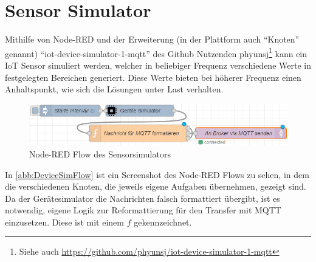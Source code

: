 \section{Sensor Simulator}\label{chap:iotdevicesim}
Mithilfe von Node-RED und der Erweiterung (in der Plattform auch \enquote{Knoten} genannt) \enquote{iot-device-simulator-1-mqtt} des Github Nutzenden phyunsj\footnote{Siehe auch \url{https://github.com/phyunsj/iot-device-simulator-1-mqtt}} kann ein \ac{IoT} Sensor simuliert werden, welcher in beliebiger Frequenz verschiedene Werte in festgelegten Bereichen generiert. Diese Werte bieten bei höherer Frequenz einen Anhaltspunkt, wie sich die Lösungen unter Last verhalten.
\begin{figure}[H]
\centering
\includegraphics[width=\textwidth]{graphics/Device-Simulator-Flow.png}
\caption{Node-RED Flow des Sensorsimulators}
\label{abb:DeviceSimFlow}
\end{figure}

In \autoref{abb:DeviceSimFlow} ist ein Screenshot des Node-RED Flows zu sehen, in dem die verschiedenen Knoten, die jeweils eigene Aufgaben übernehmen, gezeigt sind. Da der Gerätesimulator die Nachrichten falsch formattiert übergibt, ist es notwendig, eigene Logik zur Reformattierung für den Transfer mit \ac{MQTT} einzusetzen. Diese ist mit einem $f$ gekennzeichnet.


